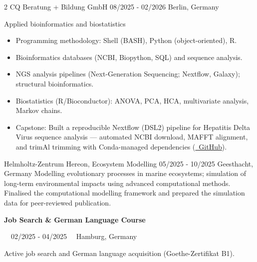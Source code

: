 \documentclass{thejus_cv}
\begin{document}
\begin{paracol}{2}
             {CQ Beratung + Bildung GmbH}
             {08/2025 - 02/2026}
             {Berlin, Germany}
             {Applied bioinformatics and biostatistics
             \begin{itemize}\setlength{\itemsep}{0.05em}
                 \item Programming methodology: Shell (BASH), Python (object-oriented), R.
                 \item Bioinformatics databases (NCBI, Biopython, SQL) and sequence analysis.
                 \item NGS analysis pipelines (Next-Generation Sequencing; Nextflow, Galaxy); structural bioinformatics.
                 \item Biostatistics (R/Bioconductor): ANOVA, PCA, HCA, multivariate analysis, Markov chains.
                 \item Capstone: Built a reproducible Nextflow (DSL2) pipeline for Hepatitis Delta Virus sequence analysis --- automated NCBI download, MAFFT alignment, and trimAl trimming with Conda-managed dependencies (\href{https://github.com/thejusmahajan/hepatitis-delta-pipeline}{\faGithub\ GitHub}).
             \end{itemize}}

             {Helmholtz-Zentrum Hereon, Ecosystem Modelling}
             {05/2025 - 10/2025}
             {Geesthacht, Germany}
             {Modelling evolutionary processes in marine ecosystems; simulation of long-term environmental impacts using advanced computational methods. Finalised the computational modelling framework and prepared the simulation data for peer-reviewed publication.}

{\large\textbf{Job Search \& German Language Course}}\par
{\small\color{cvgray}\faCalendar\ \ 02/2025 - 04/2025 \hspace{0.5cm} \faMapMarker\ \ Hamburg, Germany}\par
\vspace{0.2em}
{\color{cvlightgray}\hdashrule{\linewidth}{0.5pt}{1mm}}\par
\vspace{0.2em}
Active job search and German language acquisition (Goethe-Zertifikat B1).
\vspace{0.3em}


\end{paracol}
\end{document}
